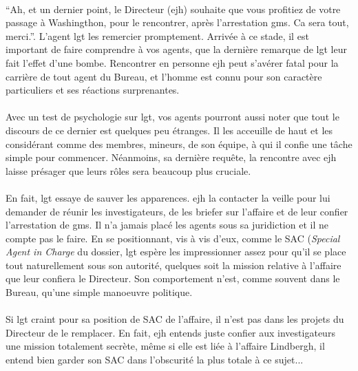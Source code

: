 \paragraph{} ``Ah, et un dernier point, le Directeur (\gls{ejh}) souhaite que vous profitiez de votre passage à Washingthon, 
pour le rencontrer, après l'arrestation \gls{gms}. Ca sera tout, merci.''. L'agent \gls{lgt} les remercier promptement. Arrivée 
à ce stade, il est important de faire comprendre à vos agents, que la dernière remarque de \gls{lgt} leur fait l'effet d'une 
bombe. Rencontrer en personne \gls{ejh} peut s'avérer fatal pour la carrière de tout agent du Bureau, et l'homme est connu pour
son caractère particuliers et ses réactions surprenantes.

\paragraph{} Avec un test de psychologie sur \gls{lgt}, vos agents pourront aussi noter que tout le discours de ce dernier est 
quelques peu étranges. Il les acceuille de haut et les considérant comme des membres, mineurs, de son équipe, à qui il confie une
tâche simple pour commencer. Néanmoins, sa dernière requête, la rencontre avec \gls{ejh} laisse présager que leurs rôles sera 
beaucoup plus cruciale.

\paragraph{} En fait, \gls{lgt} essaye de sauver les apparences. \gls{ejh} la contacter la veille pour lui demander de réunir
les investigateurs, de les briefer sur l'affaire et de leur confier l'arrestation de \gls{gms}. Il n'a jamais placé les agents
sous sa juridiction et il ne compte pas le faire. En se positionnant, vis à vis d'eux, comme le SAC (\emph{Special Agent in Charge}
du dossier, \gls{lgt} espère les impressionner assez pour qu'il se place tout naturellement sous son autorité, quelques soit la
mission relative à l'affaire que leur confiera le Directeur. Son comportement n'est, comme souvent dans le Bureau, qu'une simple
manoeuvre politique.

\paragraph{} Si \gls{lgt} craint pour sa position de SAC de l'affaire, il n'est pas dans les projets du Directeur de le remplacer.
En fait, \gls{ejh} entends juste confier aux investigateurs une mission totalement secrète, même si elle est liée à l'affaire
Lindbergh, il entend bien garder son SAC dans l'obscurité la plus totale à ce sujet...


